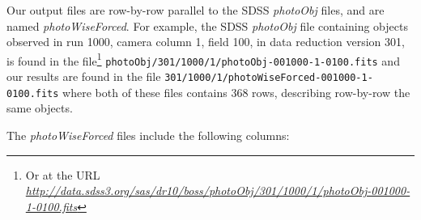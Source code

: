 \documentclass[12pt,preprint]{aastex}
\newcommand{\niceurl}[1]{\href{#1}{\textsl{#1}}}
\begin{document}
\newcommand{\filetype}[1]{\textsl{#1}}

Our output files are row-by-row parallel to the SDSS
\filetype{photoObj} files, and are named \filetype{photoWiseForced}.
For example, the SDSS \filetype{photoObj} file containing objects
observed in run 1000, camera column 1, field 100, in data reduction
version 301, is found in the file\footnote{Or at the URL
  \niceurl{http://data.sdss3.org/sas/dr10/boss/photoObj/301/1000/1/photoObj-001000-1-0100.fits}}
%
\verb+photoObj/301/1000/1/photoObj-001000-1-0100.fits+
%
and our results are found in the file
%
\verb+301/1000/1/photoWiseForced-001000-1-0100.fits+
%
where both of these files contains 368 rows, describing row-by-row the
same objects.

\newcommand{\colname}[1]{\texttt{#1}}

The \filetype{photoWiseForced} files include the following columns:
\parskip0pt
\end{document}
